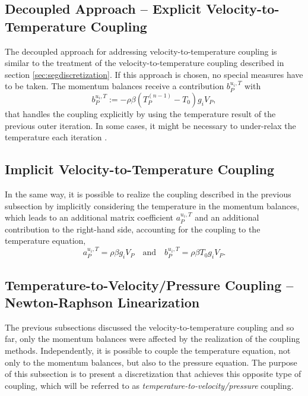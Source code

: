 \subsection{Decoupled Approach -- Explicit Velocity-to-Temperature Coupling}

The decoupled approach for addressing velocity-to-temperature coupling is similar to the treatment of the velocity-to-temperature coupling described in section \ref{sec:segdiscretization}. If this approach is chosen, no special measures have to be taken. The momentum balances receive a contribution \( b_P^{u_i,T}\) with
\begin{displaymath}
  b_P^{u_i,T} := - \rho \beta \left( T_P^{(n-1)} - T_0 \right) g_i V_P,
\end{displaymath}
that handles the coupling explicitly by using the temperature result of the previous outer iteration. In some cases, it might be necessary to under-relax the temperature each iteration \cite{ferziger02}.

\subsection{Implicit Velocity-to-Temperature Coupling}

In the same way, it is possible to realize the coupling described in the previous subsection by implicitly considering the temperature in the momentum balances, which leads to an additional matrix coefficient \(a_P^{u_i,T}\) and an additional contribution to the right-hand side, accounting for the coupling to the temperature equation,
\begin{displaymath}
  a_P^{u_i,T} = \rho \beta g_i V_P 
  \quad \text{and} \quad
  b_P^{u_i,T} = \rho \beta T_0 g_i V_P.
\end{displaymath}

\subsection{Temperature-to-Velocity/Pressure Coupling -- Newton-Raphson Linearization}
\label{sec:nrcoupled}

The previous subsections discussed the velocity-to-temperature coupling and so far, only the momentum balances were affected by the realization of the coupling methods. Independently, it is possible to couple the temperature equation, not only to the momentum balances, but also to the pressure equation. The purpose of this subsection is to present a discretization that achieves this opposite type of coupling, which will be referred to as \emph{temperature-to-velocity/pressure} coupling.


